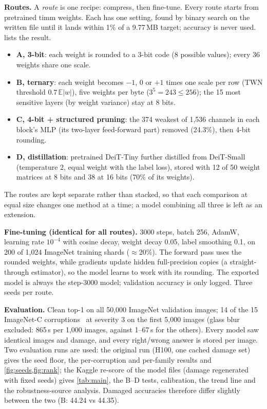 \documentclass[10pt,twocolumn,letterpaper]{article}
\begin{document}
\textbf{Routes.} A \emph{route} is one recipe: compress, then fine-tune. Every route starts from pretrained timm weights. Each has one setting, found by binary search on the written file until it lands within 1\% of a 9.77\,MB target; accuracy is never used.  lists the result.
\begin{itemize}\setlength\itemsep{0pt}
\item \textbf{A, 3-bit}: each weight is rounded to a 3-bit code (8 possible values); every 36 weights share one scale.
\item \textbf{B, ternary}: each weight becomes $-1$, $0$ or $+1$ times one scale per row (TWN threshold $0.7\,\mathbb{E}|w|$), five weights per byte ($3^5=243\le256$); the 15 most sensitive layers (by weight variance) stay at 8 bits.
\item \textbf{C, 4-bit + structured pruning}: the 374 weakest of 1,536 channels in each block's MLP (its two-layer feed-forward part) removed (24.3\%), then 4-bit rounding.
\item \textbf{D, distillation}: pretrained DeiT-Tiny further distilled from DeiT-Small (temperature 2, equal weight with the label loss), stored with 12 of 50 weight matrices at 8 bits and 38 at 16 bits (70\% of its weights).
\end{itemize}
The routes are kept separate rather than stacked, so that each comparison at equal size changes one method at a time; a model combining all three is left as an extension.

\textbf{Fine-tuning (identical for all routes).} 3000 steps, batch 256, AdamW, learning rate $10^{-4}$ with cosine decay, weight decay 0.05, label smoothing 0.1, on 200 of 1,024 ImageNet training shards ($\approx$20\%). The forward pass uses the rounded weights, while gradients update hidden full-precision copies (a straight-through estimator), so the model learns to work with its rounding. The exported model is always the step-3000 model; validation accuracy is only logged. Three seeds per route.

\textbf{Evaluation.} Clean top-1 on all 50,000 ImageNet validation images; 14 of the 15 ImageNet-C corruptions~\cite{hendrycks2019benchmarking} at severity 3 on the first 5,000 images (glass blur excluded: 865\,s per 1,000 images, against 1--67\,s for the others). Every model saw identical images and damage, and every right/wrong answer is stored per image. Two evaluation runs are used: the original run (H100, one cached damage set) gives the seed floor, the per-corruption and per-family results and \cref{fig:seeds,fig:rank}; the Kaggle re-score of the model files (damage regenerated with fixed seeds) gives \cref{tab:main}, the B--D tests, calibration, the trend line and the robustness-source analysis. Damaged accuracies therefore differ slightly between the two (\eg B: 44.24 vs 44.35).
\end{document}
